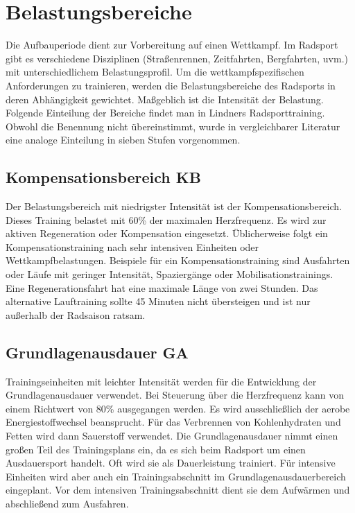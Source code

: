 \section{Belastungsbereiche}
\label{grundlagen:sport:belastungsbereiche}
Die Aufbauperiode dient zur Vorbereitung auf einen Wettkampf. Im Radsport gibt es verschiedene Disziplinen (Straßenrennen, Zeitfahrten, Bergfahrten, uvm.) mit unterschiedlichem Belastungsprofil. Um die wettkampfspezifischen Anforderungen zu trainieren, werden die Belastungsbereiche des Radsports in deren Abhängigkeit gewichtet. Maßgeblich ist die Intensität der Belastung. Folgende Einteilung der Bereiche findet man in Lindners Radsporttraining. \cite[31-39]{Radsporttraining} Obwohl die Benennung nicht übereinstimmt, wurde in vergleichbarer Literatur \cite[27]{Ausdauertrainer} eine analoge Einteilung in sieben Stufen vorgenommen. 
\subsection{Kompensationsbereich KB}
Der Belastungsbereich mit niedrigster Intensität ist der Kompensationsbereich. Dieses Training belastet mit 60\% der maximalen Herzfrequenz. Es wird zur aktiven Regeneration oder Kompensation eingesetzt. Üblicherweise folgt ein Kompensationstraining nach sehr intensiven Einheiten oder Wettkampfbelastungen. Beispiele für ein Kompensationstraining sind Ausfahrten oder Läufe mit geringer Intensität, Spaziergänge oder Mobilisationstrainings. \cite[31-32]{Radsporttraining}
Eine Regenerationsfahrt hat eine maximale Länge von zwei Stunden. Das alternative Lauftraining sollte 45 Minuten nicht übersteigen und ist nur außerhalb der Radsaison ratsam.
\subsection{Grundlagenausdauer GA}
Trainingseinheiten mit leichter Intensität werden für die Entwicklung der Grundlagenausdauer verwendet. Bei Steuerung über die Herzfrequenz kann von einem Richtwert von 80\% ausgegangen werden. Es wird ausschließlich der aerobe Energiestoffwechsel beansprucht. Für das Verbrennen von Kohlenhydraten und Fetten wird dann Sauerstoff verwendet. Die Grundlagenausdauer nimmt einen großen Teil des Trainingsplans ein, da es sich beim Radsport um einen Ausdauersport handelt. Oft wird sie als Dauerleistung trainiert. Für intensive Einheiten wird aber auch ein Trainingsabschnitt im Grundlagenausdauerbereich eingeplant. Vor dem intensiven Trainingsabschnitt dient sie dem Aufwärmen und abschließend zum Ausfahren.
